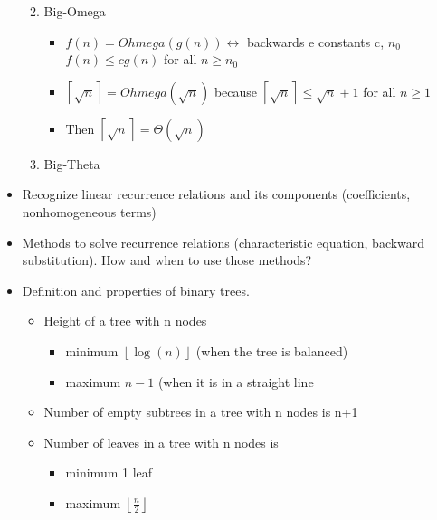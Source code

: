 \begin{itemize}
\begin{enumerate}
\begin{itemize}
      \end{itemize}
    \item Big-Omega
      \begin{itemize}
      \item $f(n)=Ohmega(g(n)) \leftrightarrow$ backwards e constants c, $n_{0}$ $f(n) \leq cg(n)$ for all $n\geq n_{0}$
      \item $\left\lceil\sqrt{n}\right\rceil=Ohmega(\sqrt{n})$ because $\left\lceil\sqrt{n}\right\rceil\leq\sqrt{n}+1$ for all $n\geq 1$
      \item Then $\left\lceil\sqrt{n}\right\rceil=\Theta(\sqrt{n})$
      \end{itemize}
    \item Big-Theta
    \end{enumerate}
  \item Recognize linear recurrence relations and its components (coefficients, nonhomogeneous terms)
  \item Methods to solve recurrence relations (characteristic equation, backward substitution). How and when to use those methods?
  \item Definition and properties of binary trees.
    \begin{itemize}
    \item Height of a tree with n nodes
      \begin{itemize}
      \item minimum $\left\lfloor\log{(n)}\right\rfloor$ (when the tree is balanced)
      \item maximum $n-1$ (when it is in a straight line
      \end{itemize}
    \item Number of empty subtrees in a tree with n nodes is n+1
    \item Number of leaves in a tree with n nodes is
      \begin{itemize}
      \item minimum 1 leaf
      \item maximum $\left\lfloor\frac{n}{2}\right\rfloor$
      \end{itemize}
    \end{itemize}
  \end{itemize}
